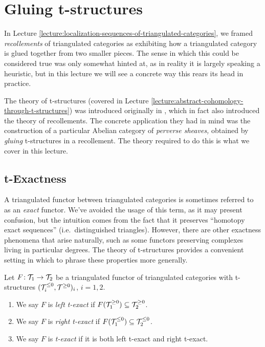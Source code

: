
\section{Gluing t-structures}
In Lecture \ref{lecture:localization-sequences-of-triangulated-categories}, we framed \emph{recollements} of triangulated categories as exhibiting how a triangulated category
is glued together from two smaller pieces. The sense in which this could be considered true was only somewhat hinted at, as in reality it is largely speaking a heuristic,
but in this lecture we will see a concrete way this rears its head in practice.

The theory of t-structures (covered in Lecture \ref{lecture:abstract-cohomology-through-t-structures}) was introduced originally in \cite{faisceaux-pervers}, which in fact also
introduced the theory of recollements. The concrete application they had in mind was the construction of a particular Abelian category of \emph{perverse sheaves,} obtained
by \emph{gluing} t-structures in a recollement. The theory required to do this is what we cover in this lecture.

\subsection{t-Exactness}
A triangulated functor between triangulated categories is sometimes referred to as an \emph{exact} functor. We've avoided the usage of this term, as it may present confusion,
but the intuition comes from the fact that it preserves ``homotopy exact sequences'' (i.e.\ distinguished triangles). However, there are other exactness phenomena that arise
naturally, such as some functors preserving complexes living in particular degrees. The theory of t-structures provides a convenient setting in which to phrase these
properties more generally.

\begin{definition}
	Let \(F\!:\mathcal{T}_1 \to \mathcal{T}_2\) be a triangulated functor of triangulated categories with t-structures \((\mathcal{T}^{\leq 0}_i,\mathcal{T}^{\geq 0})_i\), \(i=1,2\).
	\begin{enumerate}[label=(\arabic*)]
		\item We say \(F\) is \emph{left t-exact} if \(F(\mathcal{T}^{\geq 0}_1) \subseteq \mathcal{T}^{\geq 0}_2\).
		\item We say \(F\) is \emph{right t-exact} if \(F(\mathcal{T}^{\leq 0}_1) \subseteq \mathcal{T}^{\leq 0}_2\).
		\item We say \(F\) is \emph{t-exact} if it is both left t-exact and right t-exact.
	\end{enumerate}
\end{definition}

